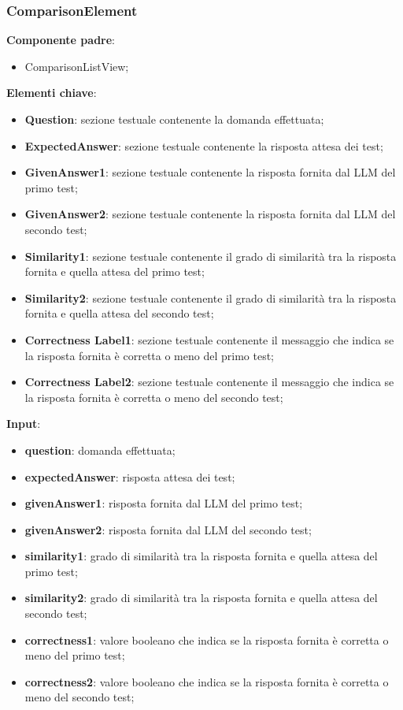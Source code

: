 \subsubsection{ComparisonElement}
\textbf{Componente padre}:
\begin{itemize}
    \item ComparisonListView;
\end{itemize}
\textbf{Elementi chiave}:
\begin{itemize}
    \item \textbf{Question}: sezione testuale contenente la domanda effettuata;
    \item \textbf{ExpectedAnswer}: sezione testuale contenente la risposta attesa dei test;
    \item \textbf{GivenAnswer1}: sezione testuale contenente la risposta fornita dal LLM del primo test;
    \item \textbf{GivenAnswer2}: sezione testuale contenente la risposta fornita dal LLM del secondo test;
    \item \textbf{Similarity1}: sezione testuale contenente il grado di similarità tra la risposta fornita e quella attesa del primo test;
    \item \textbf{Similarity2}: sezione testuale contenente il grado di similarità tra la risposta fornita e quella attesa del secondo test;
    \item \textbf{Correctness Label1}: sezione testuale contenente il messaggio che indica se la risposta fornita è corretta o meno del primo test;
    \item \textbf{Correctness Label2}: sezione testuale contenente il messaggio che indica se la risposta fornita è corretta o meno del secondo test;
\end{itemize}
\textbf{Input}:
\begin{itemize}
    \item \textbf{question}: domanda effettuata;
    \item \textbf{expectedAnswer}: risposta attesa dei test;
    \item \textbf{givenAnswer1}: risposta fornita dal LLM del primo test;
    \item \textbf{givenAnswer2}: risposta fornita dal LLM del secondo test;
    \item \textbf{similarity1}: grado di similarità tra la risposta fornita e quella attesa del primo test;
    \item \textbf{similarity2}: grado di similarità tra la risposta fornita e quella attesa del secondo test;
    \item \textbf{correctness1}: valore booleano che indica se la risposta fornita è corretta o meno del primo test;
    \item \textbf{correctness2}: valore booleano che indica se la risposta fornita è corretta o meno del secondo test;
\end{itemize}
